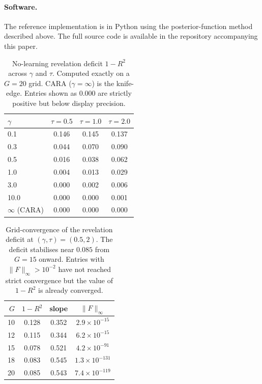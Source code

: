 \documentclass[12pt,letterpaper]{article}
\theoremstyle{definition}
\theoremstyle{remark}
\newcommand{\1}{\mathbf{1}}
\begin{document}
\paragraph{Software.} The reference implementation is in Python using the
posterior-function method described above. The full source code is
available in the repository accompanying this paper.

\begin{table}[htbp]
\centering
\caption{No-learning revelation deficit $1-R^{2}$ across $\gamma$ and
$\tau$. Computed exactly on a $G=20$ grid. CARA ($\gamma=\infty$) is the
knife-edge. Entries shown as $0.000$ are strictly positive but below
display precision.}
\label{tab:smooth}
\begin{tabular}{lccc}
   \toprule
   $\gamma$ & $\tau=0.5$ & $\tau=1.0$ & $\tau=2.0$ \\
   \midrule
    0.1   & 0.146 & 0.145 & 0.137 \\
    0.3   & 0.044 & 0.070 & 0.090 \\
    0.5   & 0.016 & 0.038 & 0.062 \\
    1.0   & 0.004 & 0.013 & 0.029 \\
    3.0   & 0.000 & 0.002 & 0.006 \\
   10.0   & 0.000 & 0.000 & 0.001 \\
   $\infty$ (CARA) & 0.000 & 0.000 & 0.000 \\
   \bottomrule
\end{tabular}
\end{table}

\begin{table}[htbp]
\centering
\caption{Grid-convergence of the revelation deficit at $(\gamma,\tau)=(0.5,2)$.
The deficit stabilises near $0.085$ from $G=15$ onward. Entries with
$\|F\|_\infty>10^{-2}$ have not reached strict convergence but the
value of $1-R^{2}$ is already converged.}
\label{tab:G-ladder}
\begin{tabular}{rccc}
\toprule
$G$ & $1-R^{2}$ & slope & $\|F\|_\infty$ \\
\midrule
\rowcolor{black!15} 10 & 0.128 & 0.352 & $2.9\times 10^{-15}$ \\
\rowcolor{black!15} 12 & 0.115 & 0.344 & $6.2\times 10^{-15}$ \\
15 & 0.078 & 0.521 & $4.2\times 10^{-91}$ \\
18 & 0.083 & 0.545 & $1.3\times 10^{-131}$ \\
20 & 0.085 & 0.543 & $7.4\times 10^{-119}$ \\
\bottomrule
\end{tabular}
\end{table}
\end{document}

